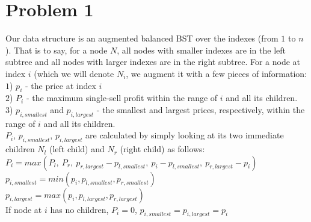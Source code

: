 \documentclass{article}
\theoremstyle{casestyle}
\begin{document}
\section *{Problem 1}
Our data structure is an augmented balanced BST over the indexes (from $1$ to $n$). That is to say, for a node $N$, all nodes with smaller indexes are in the left subtree and all nodes with larger indexes are in the right subtree. For a node at index $i$ (which we will denote $N_i$, we augment it with a few pieces of information:\\

$1$) $p_i$ - the price at index $i$\\
$2$) $P_i$ - the maximum single-sell profit within the range of $i$ and all its children. \\
$3$) $p_{i, smallest}$ and $p_{i, largest}$ - the smallest and largest prices, respectively, within the range of $i$ and all its children. \\

$P_i$, $p_{i, smallest}$, $p_{i, largest}$ are calculated by simply looking at its two immediate children $N_l$ (left child) and $N_r$ (right child) as follows: \\
$P_i = max(P_l,\ P_r,\ p_{r, largest} - p_{l, smallest},\ p_i - p_{l, smallest},\ p_{r, largest} - p_i) $\\
$p_{i, smallest} = min(p_i, p_{l, smallest}, p_{r, smallest})$\\
$p_{i, largest} = max(p_i, p_{l, largest}, p_{r, largest})$\\
If node at $i$ has no children, $P_i = 0$, $p_{i, smallest} = p_{i, largest} = p_i$\\
\end{document}
